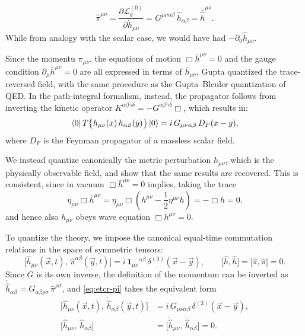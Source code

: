 \documentclass[12pt,a4paper,oneside]{article}
\numberwithin{equation}{section}   %
\begin{document}
\begin{equation}
  \hat{\pi}^{\mu\nu}
  = \frac{\partial \mathcal{L}^{(0)}_g}{\partial \dot{h}_{\mu\nu}}
  = G^{\mu\nu\alpha\beta}\, \dot{\hat{h}}_{\alpha\beta}
  = \dot{\bar{\hat{h}}}^{\mu\nu}.
\end{equation}
While from analogy with the scalar case,
we would have had $-\partial_0 \hat{h}_{\mu\nu}$.

Since the momentu $\pi_{\mu\nu}$, the equations of motion $\Box\bar h^{\mu\nu}=0$
 and the
gauge condition $\partial_\mu\bar h^{\mu\nu}=0$ are all expressed in
terms of $\bar h_{\mu\nu}$, Gupta quantized the trace-reversed field,
with the same procedure as the Gupta--Bleuler
quantization of QED.
In the path-integral formalism, instead, the propagator follows from inverting
the kinetic operator $K^{\alpha\beta\gamma\delta}=-G^{\alpha\beta\gamma\delta}\Box$,
which results in:
\begin{equation}
  \bra{0}T\bigl\{h_{\mu\nu}(x)\,h_{\alpha\beta}(y)\bigr\}\ket{0}
  = i\,G_{\mu\nu\alpha\beta}\,D_F(x-y),
\end{equation}
where $D_F$ is the Feynman propagator of a massless scalar field.

We instead quantize canonically the metric perturbation $h_{\mu\nu}$, which is
the physically observable field, and show that the
same results are recovered. This is consistent, since in vacuum
$\Box\bar h^{\mu\nu}=0$ implies, taking the trace
\begin{equation}
    \eta_{\mu\nu} \Box \bar{h}^{\mu\nu}=\eta_{\mu\nu}\Box (h^{\mu\nu}-\frac12\eta^{\mu\nu}h)=-\Box h=0.
\end{equation} 
and hence also $h_{\mu\nu}$
obeys wave equation
$\Box h^{\mu\nu}=0$.

To quantize the theory, we impose the canonical equal-time commutation
relations in the space of symmetric tensors:
\begin{equation}
  \bigl[\hat{h}_{\mu\nu}(\vec{x},t),\, \hat{\pi}^{\alpha\beta}(\vec{y},t)\bigr]
  = i\, \mathbf{1}_{\mu\nu}{}^{\alpha\beta}\, \delta^{(3)}(\vec{x}-\vec{y}),
  \qquad
  \bigl[\hat{h},\hat{h}\bigr]
  = \bigl[\hat{\pi},\hat{\pi}\bigr] = 0 .
  \label{eq:etcr-pi}
\end{equation}
Since $G$ is its own inverse, the definition of the momentum can be inverted
as $\dot{\hat{h}}_{\alpha\beta} = G_{\alpha\beta\rho\sigma}\,\hat{\pi}^{\rho\sigma}$,
and \eqref{eq:etcr-pi} takes the equivalent form
\begin{equation}
\boxed{
  \begin{aligned}
  \bigl[\hat{h}_{\mu\nu}(\vec{x},t),\, \dot{\hat{h}}_{\alpha\beta}(\vec{y},t)\bigr]
  &= i\, G_{\mu\nu\alpha\beta}\, \delta^{(3)}(\vec{x}-\vec{y}),\\[0.2cm]
  \bigl[\hat{h}_{\mu\nu},\, \hat{h}_{\alpha\beta}\bigr]
  &= \bigl[\dot{\hat{h}}_{\mu\nu},\, \dot{\hat{h}}_{\alpha\beta}\bigr] = 0 .
  \end{aligned}}
\label{eq:etcr}
\end{equation}
\end{document}
